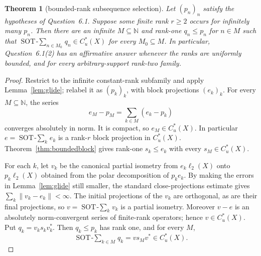 \documentclass[11pt]{article}
\newtheorem{theorem}{Theorem}
\newcommand{\Cu}{C_u^*}
\newcommand{\ellTwo}{\ell_2}
\newcommand{\SOT}{\mathop{\mathrm{SOT}\!-\!\sum}}
\begin{document}
\begin{theorem}[bounded-rank subsequence selection]\label{thm:subsequence}
Let $(p_n)_n$ satisfy the hypotheses of Question~6.1.  Suppose some finite
rank $r\geq2$ occurs for infinitely many $p_n$.  Then there are an infinite
$M\subseteq\mathbb N$ and rank-one $q_n\leq p_n$ for $n\in M$ such that
$\SOT_{n\in M_0}q_n\in\Cu(X)$ for every $M_0\subseteq M$.
In particular, Question~6.1(2) has an affirmative answer whenever the ranks
are uniformly bounded, and for every arbitrary-support rank-two family.
\end{theorem}
\begin{proof}
Restrict to the infinite constant-rank subfamily and apply
Lemma~\ref{lem:glide}; relabel it as $(p_k)_k$, with block projections
$(e_k)_k$.  For every $M\subseteq\mathbb N$, the series
\[
 e_M-p_M=\sum_{k\in M}(e_k-p_k)
\]
converges absolutely in norm.  It is compact, so $e_M\in\Cu(X)$.  In
particular $e=\SOT_ke_k$ is a rank-$r$ block projection in $\Cu(X)$.
Theorem~\ref{thm:boundedblock} gives rank-one $s_k\leq e_k$ with every
$s_M\in\Cu(X)$.

For each $k$, let $v_k$ be the canonical partial isometry from
$e_k\ellTwo(X)$ onto $p_k\ellTwo(X)$ obtained from the polar decomposition
of $p_ke_k$.  By making the errors in Lemma~\ref{lem:glide} still smaller,
the standard close-projections estimate gives
$\sum_k\|v_k-e_k\|<\infty$.  The initial projections of the $v_k$ are
orthogonal, as are their final projections, so $v=\SOT_kv_k$ is a partial
isometry.  Moreover $v-e$ is an absolutely norm-convergent series of
finite-rank operators; hence $v\in\Cu(X)$.  Put
$q_k=v_ks_kv_k^*$.  Then $q_k\leq p_k$ has rank one, and for every $M$,
\[
 \SOT_{k\in M}q_k=vs_Mv^*\in\Cu(X).
\]
\end{proof}
\end{document}
